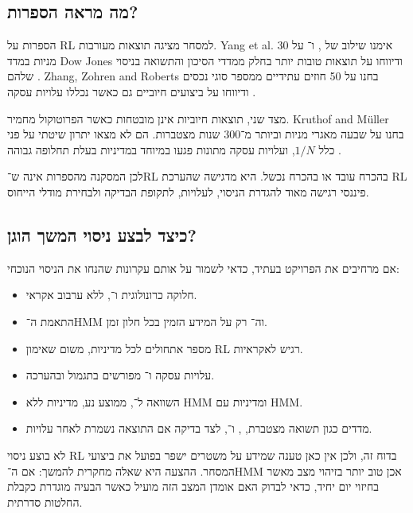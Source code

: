 \subsection{מה מראה הספרות?}

הספרות על RL למסחר מציגה תוצאות מעורבות. Yang et al. אימנו שילוב של ,  ו־ על 30 מניות במדד Dow Jones ודיווחו על תוצאות טובות יותר בחלק ממדדי הסיכון והתשואה בניסוי שלהם \cite{yang2020ensemble}. Zhang, Zohren and Roberts בחנו  על 50 חוזים עתידיים ממספר סוגי נכסים ודיווחו על ביצועים חיוביים גם כאשר נכללו עלויות עסקה \cite{zhang2019drltrading}.

מצד שני, תוצאות חיוביות אינן מובטחות כאשר הפרוטוקול מחמיר. Kruthof and M{\"u}ller בחנו  על שבעה מאגרי מניות וביותר מ־300 שנות  מצטברות. הם לא מצאו יתרון שיטתי על פני כלל \(1/N\), ועלויות עסקה מתונות פגעו במיוחד במדיניות בעלת תחלופה גבוהה \cite{kruthof2025beat1n}.

לכן המסקנה מהספרות אינה ש־RL בהכרח עובד או בהכרח נכשל. היא מדגישה שהערכת RL פיננסי רגישה מאוד להגדרת הניסוי, לעלויות, לתקופת הבדיקה ולבחירת מודלי הייחוס.

\subsection{כיצד לבצע ניסוי המשך הוגן?}

אם מרחיבים את הפרויקט בעתיד, כדאי לשמור על אותם עקרונות שהנחו את הניסוי הנוכחי:

\begin{itemize}
    \item חלוקה כרונולוגית ו־, ללא ערבוב אקראי.
    \item התאמת ה־HMM וה־ רק על המידע הזמין בכל חלון זמן.
    \item מספר אתחולים לכל מדיניות, משום שאימון RL רגיש לאקראיות.
    \item עלויות עסקה ו־ מפורשים בתגמול ובהערכה.
    \item השוואה ל־, ממוצע נע, מדיניות ללא HMM ומדיניות עם HMM.
    \item מדדים כגון תשואה מצטברת, ,  ו־, לצד בדיקה אם התוצאה נשמרת לאחר עלויות.
\end{itemize}

לא בוצע ניסוי RL בדוח זה, ולכן אין כאן טענה שמידע על משטרים ישפר בפועל את ביצועי המסחר. ההצעה היא שאלה מחקרית להמשך: אם ה־HMM אכן טוב יותר בזיהוי מצב מאשר בחיזוי יום יחיד, כדאי לבדוק האם אומדן המצב הזה מועיל כאשר הבעיה מוגדרת כקבלת החלטות סדרתית.
